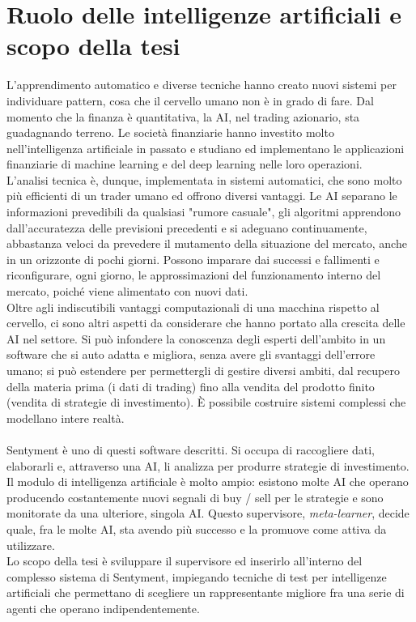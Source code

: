 \documentclass[a4paper,12pt]{report}
\begin{document}
\section{Ruolo delle intelligenze artificiali e scopo della tesi}		
L'apprendimento automatico e diverse tecniche hanno creato nuovi sistemi per individuare pattern, cosa che il cervello umano non è in grado di fare. Dal momento che la finanza è quantitativa, la AI, nel trading azionario, sta guadagnando terreno. Le società finanziarie hanno investito molto nell'intelligenza artificiale in passato e studiano ed implementano le applicazioni finanziarie di machine learning e del deep learning nelle loro operazioni.\\
L'analisi tecnica è, dunque, implementata in sistemi automatici, che sono molto più efficienti di un trader umano ed offrono diversi vantaggi. Le AI separano le informazioni prevedibili da qualsiasi "rumore casuale", gli algoritmi apprendono dall'accuratezza delle previsioni precedenti e si adeguano continuamente, abbastanza veloci da prevedere il mutamento della situazione del mercato, anche in un orizzonte di pochi giorni. Possono imparare dai successi e fallimenti e riconfigurare, ogni giorno, le approssimazioni del funzionamento interno del mercato, poiché viene alimentato con nuovi dati.\\
Oltre agli indiscutibili vantaggi computazionali di una macchina rispetto al cervello, ci sono altri aspetti da considerare che hanno portato alla crescita delle AI nel settore. Si può infondere la conoscenza degli esperti dell'ambito in un software che si auto adatta e migliora, senza avere gli svantaggi dell'errore umano; si può estendere per permettergli di gestire diversi ambiti, dal recupero della materia prima (i dati di trading) fino alla vendita del prodotto finito (vendita di strategie di investimento). È possibile costruire sistemi complessi che modellano intere realtà.\\~\\
Sentyment è uno di questi software descritti. Si occupa di raccogliere dati, elaborarli e, attraverso una AI, li analizza per produrre strategie di investimento. Il modulo di intelligenza artificiale è molto ampio: esistono molte AI che operano producendo costantemente nuovi segnali di buy / sell per le strategie e sono monitorate da una ulteriore, singola AI. Questo supervisore, \textit{meta-learner}, decide quale, fra le molte AI, sta avendo più successo e la promuove come attiva da utilizzare.\\
Lo scopo della tesi è sviluppare il supervisore ed inserirlo all'interno del complesso sistema di Sentyment, impiegando tecniche di test per intelligenze artificiali che permettano di scegliere un rappresentante migliore fra una serie di agenti che operano indipendentemente.
\end{document}
